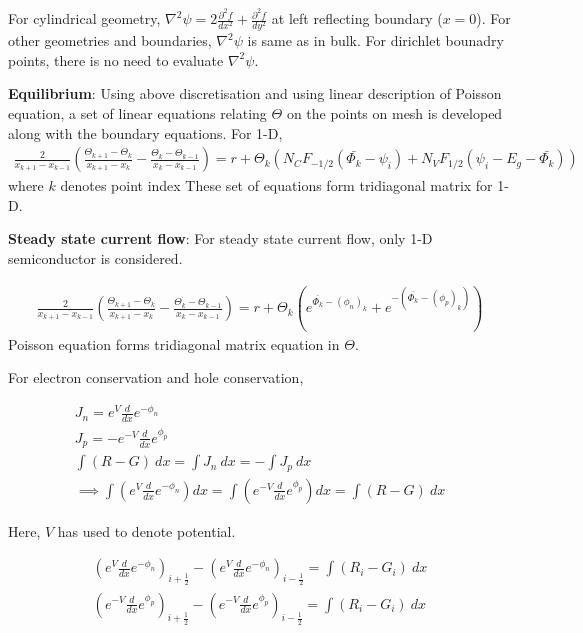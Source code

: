 For cylindrical geometry, $\nabla^2 \psi = 2 \frac{\partial^2 f}{dx^2} + \frac{\partial^2 f}{dy^2}$ at left reflecting boundary ($x=0$).  For other geometries and boundaries, $\nabla^2 \psi$ is same as in bulk.
For dirichlet bounadry points, there is no need to evaluate $\nabla^2 \psi$. 

\textbf{Equilibrium}:
Using above discretisation and using linear description of Poisson equation, a set of linear equations relating $\Theta$ on the points on mesh is developed along with the boundary equations. 
For 1-D, 
\begin{align*}
\frac{2}{x_{k+1}-x_{k-1}}\left(\frac{\Theta_{k+1}-\Theta_k}{x_{k+1}-x_{k}}  - \frac{\Theta_{k}-\Theta_{k-1}}{x_{k}-x_{k-1}} \right) = r + \Theta_k ( N_C F_{-1/2}(\bar{\Phi_k}-\psi_i) + N_V F_{1/2}(\psi_i-E_g-\bar{\Phi_k}))
\end{align*}
where $k$ denotes point index
These set of equations form tridiagonal matrix for 1-D.

\textbf{Steady state current flow}:
For steady state current flow, only 1-D semiconductor is considered.

\begin{align*}
\frac{2}{x_{k+1}-x_{k-1}}\left(\frac{\Theta_{k+1}-\Theta_k}{x_{k+1}-x_{k}}  - \frac{\Theta_{k}-\Theta_{k-1}}{x_{k}-x_{k-1}} \right) = r + \Theta_k ( e^{\bar{\Phi_k}-(\phi_n)_k} + e^{-(\bar{\Phi_k}-(\phi_p)_k)})
\end{align*}
Poisson equation forms tridiagonal matrix equation in $\Theta$.

For electron conservation and hole conservation,

\begin{align*}
J_n = e^V \frac{d}{dx} e^{-\phi_n} \\
J_p = -e^{-V} \frac{d}{dx} e^{\phi_p} \\
\int (R-G)\ dx = \int J_n\ dx = - \int J_p\ dx \\
\implies \int {(e^V \frac{d}{dx} e^{-\phi_n}) dx}  = \int {(e^{-V} \frac{d}{dx} e^{\phi_p}) dx} = \int {(R - G)\ dx}
\tag{2.18} \label{eq:33}
\end{align*}

Here, $V$ has used to denote potential.

\begin{align*}
({e^V \frac{d}{dx} e^{-\phi_n}})_{i+\frac{1}{2}} - ({e^V \frac{d}{dx} e^{-\phi_n}})_{i-\frac{1}{2}} = \int {(R_i - G_i)\ dx} \\
({e^{-V} \frac{d}{dx} e^{\phi_p}})_{i+\frac{1}{2}} - ({e^{-V} \frac{d}{dx} e^{\phi_p}})_{i-\frac{1}{2}} = \int {(R_i - G_i)\ dx} 
\tag{2.19} \label{eq:34}
\end{align*}

